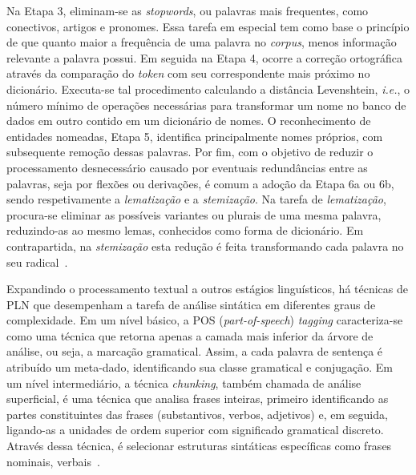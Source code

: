 \documentclass{SBCbookchapter}
\begin{document}
Na Etapa 3, eliminam-se as \textit{stopwords}, ou palavras mais frequentes, como conectivos, artigos e pronomes. Essa tarefa em especial tem como base o princípio de que quanto maior a frequência de uma palavra no \textit{corpus}, menos informação relevante a palavra possui. Em seguida na Etapa 4, ocorre a correção ortográfica através da comparação do \textit{token} com seu correspondente mais próximo no dicionário. Executa-se tal procedimento calculando a distância Levenshtein, \textit{i.e.}, o número mínimo de operações necessárias para transformar um nome no banco de dados em outro contido em um dicionário de nomes. O reconhecimento de entidades nomeadas, Etapa 5, identifica principalmente nomes próprios, com subsequente remoção dessas palavras. Por fim, com o objetivo de reduzir o processamento desnecessário causado por eventuais redundâncias entre as palavras, seja por flexões ou derivações, é comum a adoção da Etapa 6a ou 6b, sendo respetivamente a \textit{lematização} e a \textit{stemização}. Na tarefa de \textit{lematização}, procura-se eliminar as possíveis variantes ou plurais de uma mesma palavra, reduzindo-as ao mesmo lemas, conhecidos como forma de dicionário. Em contrapartida, na \textit{stemização} esta redução é feita transformando cada palavra no seu radical~\cite{icnc-2020-nicollas, navigli2009word,manning1999foundations}.
 
Expandindo o processamento textual a outros estágios linguísticos, há técnicas de PLN que desempenham a tarefa de análise sintática em diferentes graus de complexidade. Em um nível básico, a POS (\textit{part-of-speech}) \textit{tagging} caracteriza-se como uma técnica que retorna apenas a camada mais inferior da árvore de análise, ou seja, a marcação gramatical. Assim, a cada palavra de sentença é atribuído um meta-dado, identificando sua classe gramatical e conjugação. Em um nível intermediário, a técnica \textit{chunking}, também chamada de análise superficial, é uma técnica que analisa frases inteiras, primeiro identificando as partes constituintes das frases (substantivos, verbos, adjetivos) e, em seguida, ligando-as a unidades de ordem superior com significado gramatical discreto. Através dessa técnica, é selecionar estruturas sintáticas específicas como frases nominais, verbais~\cite{manning2014stanford}.

\end{document}
